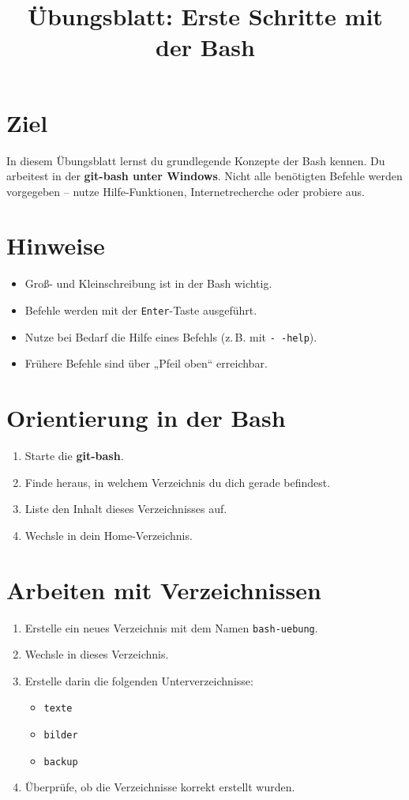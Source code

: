 \documentclass[a4paper,11pt]{article}
\title{Übungsblatt: Erste Schritte mit der Bash}
\author{}
\date{}
\begin{document}
\maketitle

\section*{Ziel}
In diesem Übungsblatt lernst du grundlegende Konzepte der Bash kennen.
Du arbeitest in der \textbf{git-bash unter Windows}.  
Nicht alle benötigten Befehle werden vorgegeben – nutze Hilfe-Funktionen,
Internetrecherche oder probiere aus.

\section*{Hinweise}
\begin{itemize}
  \item Groß- und Kleinschreibung ist in der Bash wichtig.
  \item Befehle werden mit der \texttt{Enter}-Taste ausgeführt.
  \item Nutze bei Bedarf die Hilfe eines Befehls (z.\,B. mit \texttt{-\,-help}).
  \item Frühere Befehle sind über „Pfeil oben“ erreichbar. 
\end{itemize}
 
\section{Orientierung in der Bash}

\begin{enumerate}[label=\arabic*.]
  \item Starte die \textbf{git-bash}.
  \item Finde heraus, in welchem Verzeichnis du dich gerade befindest.
  \item Liste den Inhalt dieses Verzeichnisses auf.
  \item Wechsle in dein Home-Verzeichnis.
\end{enumerate}

\section{Arbeiten mit Verzeichnissen}

\begin{enumerate}[label=\arabic*.]
  \item Erstelle ein neues Verzeichnis mit dem Namen \texttt{bash-uebung}.
  \item Wechsle in dieses Verzeichnis.
  \item Erstelle darin die folgenden Unterverzeichnisse:
  \begin{itemize}
    \item \texttt{texte}
    \item \texttt{bilder}
    \item \texttt{backup}
  \end{itemize}
  \item Überprüfe, ob die Verzeichnisse korrekt erstellt wurden.
\end{enumerate}
\end{document}

